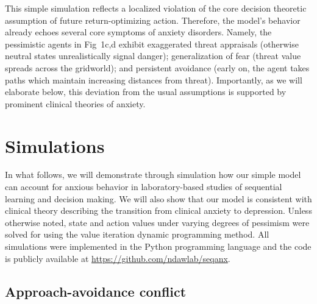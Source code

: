 \documentclass[11pt]{article} %
\begin{document}
This simple simulation reflects a localized violation of the core decision theoretic assumption of future return-optimizing action. Therefore, the model's behavior already echoes several core symptoms of anxiety disorders. Namely, the pessimistic agents in Fig~1c,d exhibit exaggerated threat appraisals (otherwise neutral states unrealistically signal danger); generalization of fear (threat value spreads across the gridworld); and persistent avoidance (early on, the agent takes paths which maintain increasing distances from threat). Importantly, as we will elaborate below, this deviation from the usual assumptions is supported by prominent clinical theories of anxiety.

\section{Simulations}

In what follows, we will demonstrate through simulation how our simple model can account for anxious behavior in laboratory-based studies of sequential learning and decision making. We will also show that our model is consistent with clinical theory describing the transition from clinical anxiety to depression. Unless otherwise noted, state and action values under varying degrees of pessimism were solved for using the value iteration dynamic programming method\citep{SuttonBarto2018}. All simulations were implemented in the Python programming language and the code is publicly available at \url{https://github.com/ndawlab/seqanx}. 

\subsection{Approach-avoidance conflict}
\end{document}
